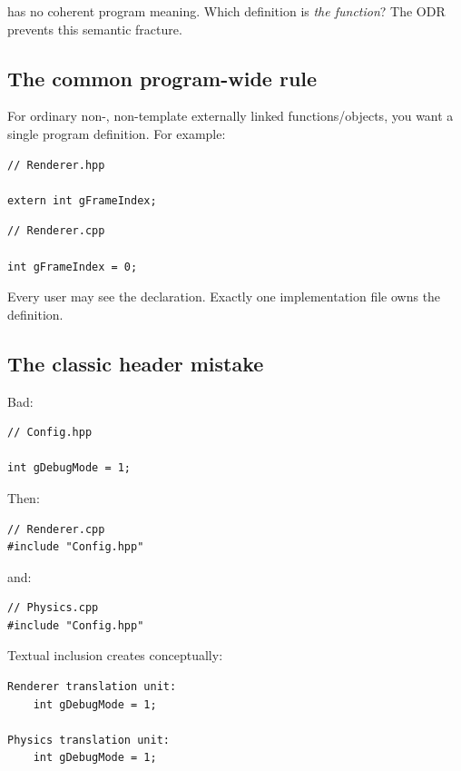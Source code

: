 has no coherent program meaning. Which definition is \emph{the function}? The ODR prevents this semantic fracture.

\subsection{The common program-wide rule}\label{05-engine-i-ch002-the-common-program-wide-rule}

\hypertarget{05-engine-i-ch002-the-common-program-wide-rule}{}

For ordinary non-, non-template externally linked functions/objects, you want a single program definition. For example:

\begin{verbatim}
// Renderer.hpp

extern int gFrameIndex;
\end{verbatim}

\begin{verbatim}
// Renderer.cpp

int gFrameIndex = 0;
\end{verbatim}

Every user may see the declaration. Exactly one implementation file owns the definition.

\subsection{The classic header mistake}\label{05-engine-i-ch002-the-classic-header-mistake}

\hypertarget{05-engine-i-ch002-the-classic-header-mistake}{}

Bad:

\begin{verbatim}
// Config.hpp

int gDebugMode = 1;
\end{verbatim}

Then:

\begin{verbatim}
// Renderer.cpp
#include "Config.hpp"
\end{verbatim}

and:

\begin{verbatim}
// Physics.cpp
#include "Config.hpp"
\end{verbatim}

Textual inclusion creates conceptually:

\begin{verbatim}
Renderer translation unit:
    int gDebugMode = 1;

Physics translation unit:
    int gDebugMode = 1;
\end{verbatim}

